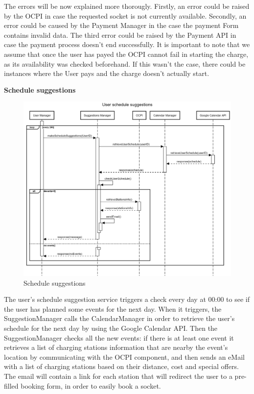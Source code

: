 \documentclass[table, 12pt]{article}
\begin{document}
The errors will be now explained more thorougly. \newline Firstly, an error could be raised by the OCPI in case the requested socket is not currently available.
Secondly, an error could be caused by the Payment Manager in the case the payment Form contains invalid data. The third error could be raised by the Payment API in case the payment process doesn't end successfully.
It is important to note that we assume that once the user has payed the OCPI cannot fail in starting the charge, as its availability was checked beforehand. If this wasn't the case, there could be instances where the User pays and the charge doesn't actually start.

\newpage
\textbf{Schedule suggestions}
\begin{center}
    \begin{figure}[H]
        \includegraphics[scale=0.20, center]{assets/sequenceDiagrams/User schedule suggestions.png}
        \caption{Schedule suggestions}
        \label{Schedule suggestions}
    \end{figure}
\end{center}
\newpage
The user's schedule suggestion service triggers a check every day at 00:00 to see if the user has planned some events for the next day.
When it triggers, the SuggestionManager calls the CalendarManager in order to retrieve the user's schedule for the next day by using the Google Calendar API.
Then the SuggestionManager checks all the new events: if there is at least one event it retrieves a list of charging stations information that are nearby the event's location by communicating with the OCPI component, and then sends an eMail with a list of charging stations based on their distance, cost and special offers.
The email will contain a link for each station that will redirect the user to a pre-filled booking form, in order to easily book a socket.
\newpage
\end{document}

